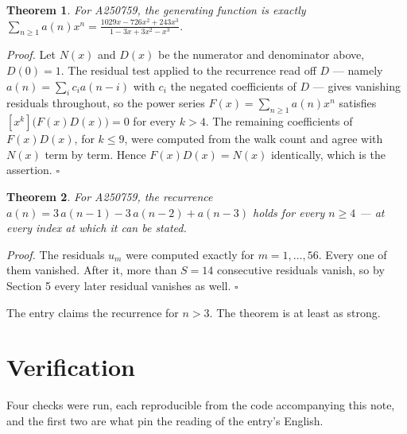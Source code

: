 \documentclass[11pt]{article}
\newtheorem{theorem}{Theorem}
\theoremstyle{definition}
\begin{document}
\begin{theorem} For A250759, the generating function is exactly $\sum_{n\ge 1} a(n)x^n = \frac{1029x - 726x^{2} + 243x^{3}}{1 - 3x + 3x^{2} - x^{3}}$.\end{theorem}

{\itshape Proof.} Let $N(x)$ and $D(x)$ be the numerator and denominator above, $D(0)=1$. The residual test applied to the recurrence read off $D$ --- namely $a(n) = \sum_i c_i a(n-i)$ with $c_i$ the negated coefficients of $D$ --- gives vanishing residuals throughout, so the power series $F(x)=\sum_{n\ge 1}a(n)x^n$ satisfies $[x^k]\bigl(F(x)D(x)\bigr) = 0$ for every $k > 4$. The remaining coefficients of $F(x)D(x)$, for $k \le 9$, were computed from the walk count and agree with $N(x)$ term by term. Hence $F(x)D(x) = N(x)$ identically, which is the assertion. $\square$

\begin{theorem} For A250759, the recurrence $a(n) = 3\,a(n-1) - 3\,a(n-2) + a(n-3)$ holds for every $n \ge 4$ --- at every index at which it can be stated.\end{theorem}

{\itshape Proof.} The residuals $u_m$ were computed exactly for $m = 1,\dots,56$. Every one of them vanished. After it, more than $S = 14$ consecutive residuals vanish, so by Section 5 every later residual vanishes as well. $\square$

The entry claims the recurrence for $n > 3$. The theorem is at least as strong.

\section{Verification}

Four checks were run, each reproducible from the code accompanying this note, and the first two are what pin the reading of the entry's English.
\end{document}
